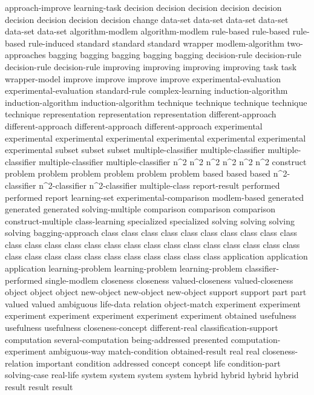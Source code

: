 approach-improve	
learning-task	
decision	decision	decision	decision	decision	decision	decision	decision	decision	
change	
data-set	data-set	data-set	data-set	data-set	data-set	
algorithm-modlem	algorithm-modlem	
rule-based	rule-based	rule-based	
rule-induced	
standard	standard	standard	
wrapper	
modlem-algorithm	
two-approaches	
bagging	bagging	bagging	bagging	bagging	
decision-rule	decision-rule	decision-rule	decision-rule	
improving	improving	improving	improving	
task	task	
wrapper-model	
improve	improve	improve	improve	
experimental-evaluation	experimental-evaluation	
standard-rule	
complex-learning	
induction-algorithm	induction-algorithm	induction-algorithm	
technique	technique	technique	technique	technique	
representation	representation	representation	
different-approach	different-approach	different-approach	different-approach	
experimental	experimental	experimental	experimental	experimental	experimental	experimental	experimental	
subset	subset	subset	
multiple-classifier	multiple-classifier	multiple-classifier	multiple-classifier	multiple-classifier	
n^2	n^2	n^2	n^2	n^2	n^2	
construct	
problem	problem	problem	problem	problem	problem	
based	based	based	
n^2-classifier	n^2-classifier	n^2-classifier	
multiple-class	
report-result	
performed	performed	
report	
learning-set	
experimental-comparison	
modlem-based	
generated	generated	generated	
solving-multiple	
comparison	comparison	comparison	
construct-multiple	
class-learning	
specialized	specialized	
solving	solving	solving	solving	
bagging-approach	
class	class	class	class	class	class	class	class	class	class	class	class	class	class	class	class	class	class	class	class	class	class	class	class	class	class	class	class	class	class	class	class	class	class	class	class	
application	application	application	
learning-problem	learning-problem	learning-problem	
classifier-performed	
single-modlem	
closeness	closeness	
valued-closeness	valued-closeness	
object	object	object	
new-object	new-object	new-object	
support	support	
part	part	
valued	valued	
ambiguous	
life-data	
relation	
object-match	
experiment	experiment	experiment	experiment	experiment	experiment	experiment	
obtained	
usefulness	usefulness	usefulness	
closeness-concept	
different-real	
classification-support	
computation	
several-computation	
being-addressed	
presented	
computation-experiment	
ambiguous-way	
match-condition	
obtained-result	
real	real	
closeness-relation	
important	
condition	
addressed	
concept	concept	
life	
condition-part	
solving-case	
real-life	
system	system	system	system	
hybrid	hybrid	hybrid	hybrid	
result	result	result	
